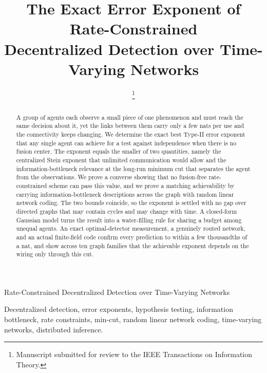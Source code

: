 \documentclass[journal]{IEEEtran}
\theoremstyle{definition}
\theoremstyle{remark}
\begin{document}
\title{The Exact Error Exponent of Rate-Constrained\\ Decentralized Detection over Time-Varying Networks}

\author{\thanks{Manuscript submitted for review to the IEEE Transactions on Information Theory.}}

%
{Rate-Constrained Decentralized Detection over Time-Varying Networks}

\maketitle

\begin{abstract}
A group of agents each observe a small piece of one phenomenon and must reach the same decision about it, yet
the links between them carry only a few nats per use and the connectivity keeps changing. We determine the exact
best Type-II error exponent that any single agent can achieve for a test against independence when there is no
fusion center. The exponent equals the smaller of two quantities, namely the centralized Stein exponent that
unlimited communication would allow and the information-bottleneck relevance at the long-run minimum cut that
separates the agent from the observations. We prove a converse showing that no fusion-free rate-constrained scheme
can pass this value, and we prove a matching achievability by carrying information-bottleneck descriptions across
the graph with random linear network coding. The two bounds coincide, so the exponent is settled with no gap over
directed graphs that may contain cycles and may change with time. A closed-form Gaussian model turns the result
into a water-filling rule for sharing a budget among unequal agents. An exact optimal-detector measurement, a
genuinely routed network, and an actual finite-field code confirm every prediction to within a few thousandths of
a nat, and show across ten graph families that the achievable exponent depends on the wiring only through this
cut.
\end{abstract}

\begin{IEEEkeywords}
Decentralized detection, error exponents, hypothesis testing, information bottleneck, rate constraints, min-cut,
random linear network coding, time-varying networks, distributed inference.
\end{IEEEkeywords}

\end{document}
